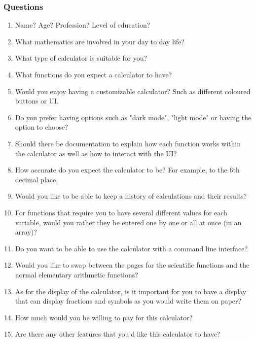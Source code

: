 \documentclass[titlepage]{article}
\begin{document}
        \subsubsection{Questions}
            \begin{enumerate}
                \item Name? Age? Profession? Level of education?
                \item What mathematics are involved in your day to day life?
                \item What type of calculator is suitable for you?
                \item What functions do you expect a calculator to have?
                \item Would you enjoy having a customizable calculator? Such as different coloured buttons or UI.
                \item Do you prefer having options such as "dark mode", "light mode" or having the option to choose?
                \item Should there be documentation to explain how each function works within the calculator as well as how to interact with the UI?
                \item How accurate do you expect the calculator to be? For example, to the 6th decimal place.
                \item Would you like to be able to keep a history of calculations and their results?
                \item For functions that require you to have several different values for each variable, would you rather they be entered one by one or all at once (in an array)?
                \item Do you want to be able to use the calculator with a command line interface?
                \item Would you like to swap between the pages for the scientific functions and the normal elementary arithmetic functions?
                \item As for the display of the calculator, is it important for you to have a display that can display fractions and symbols as you would write them on paper?
                \item How much would you be willing to pay for this calculator?
                \item Are there any other features that you'd like this calculator to have?
            \end{enumerate}
\end{document}
